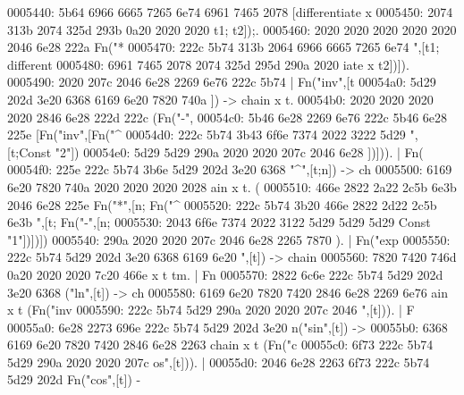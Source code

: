 \begin{bo
00010e0: 7865 647d 5c62 6567 696e 7b76 6572 6261  xed}
\begin{verba
00010f0: 7469 6d7d 0a20 2023 7479 7065 2074 6572  tim}
\begin{
0001c40: 7665 7262 6174 696d 7d0a 2020 236c 6574  verbatim}
\begin{boxe
00027a0: 647d 5c62 6567 696e 7b76 6572 6261 7469  d}
\begin{verbati
00027b0: 6d7d 0a20 2023 6c65 7420 696e 6669 7865  m}
\begin{v
0002c60: 6572 6261 7469 6d7d 0a20 2023 6c65 7420  erbatim}
\begin{
0002dc0: 7665 7262 6174 696d 7d0a 2020 236c 6574  verbatim}
\begin{boxed
0002f30: 7d5c 6265 6769 6e7b 7665 7262 6174 696d  }
\begin{verbatim
0002f40: 7d0a 2020 236c 6574 2068 6428 683a 3a74  }
\begin{v
0003e60: 6572 6261 7469 6d7d 0a20 2023 236f 7065  erbatim}
\begin{boxed
00042b0: 7d5c 6265 6769 6e7b 7665 7262 6174 696d  }
\begin{verbatim
00042c0: 7d0a 2020 2328 782c 7429 3b3b 0a20 202d  }
\begin{boxed}
\begin{boxed}
0005440: 5b64 6966 6665 7265 6e74 6961 7465 2078  [differentiate x
0005450: 2074 313b 2074 325d 293b 0a20 2020 2020   t1; t2]);.     
0005460: 2020 2020 2020 2020 2020 2046 6e28 222a             Fn("*
0005470: 222c 5b74 313b 2064 6966 6665 7265 6e74  ",[t1; different
0005480: 6961 7465 2078 2074 325d 295d 290a 2020  iate x t2])]).  
0005490: 2020 207c 2046 6e28 2269 6e76 222c 5b74     | Fn("inv",[t
00054a0: 5d29 202d 3e20 6368 6169 6e20 7820 740a  ]) -> chain x t.
00054b0: 2020 2020 2020 2020 2846 6e28 222d 222c          (Fn("-",
00054c0: 5b46 6e28 2269 6e76 222c 5b46 6e28 225e  [Fn("inv",[Fn("^
00054d0: 222c 5b74 3b43 6f6e 7374 2022 3222 5d29  ",[t;Const "2"])
00054e0: 5d29 5d29 290a 2020 2020 207c 2046 6e28  ])])).     | Fn(
00054f0: 225e 222c 5b74 3b6e 5d29 202d 3e20 6368  "^",[t;n]) -> ch
0005500: 6169 6e20 7820 740a 2020 2020 2020 2028  ain x t.       (
0005510: 466e 2822 2a22 2c5b 6e3b 2046 6e28 225e  Fn("*",[n; Fn("^
0005520: 222c 5b74 3b20 466e 2822 2d22 2c5b 6e3b  ",[t; Fn("-",[n;
0005530: 2043 6f6e 7374 2022 3122 5d29 5d29 5d29   Const "1"])])])
0005540: 290a 2020 2020 207c 2046 6e28 2265 7870  ).     | Fn("exp
0005550: 222c 5b74 5d29 202d 3e20 6368 6169 6e20  ",[t]) -> chain 
0005560: 7820 7420 746d 0a20 2020 2020 7c20 466e  x t tm.     | Fn
0005570: 2822 6c6e 222c 5b74 5d29 202d 3e20 6368  ("ln",[t]) -> ch
0005580: 6169 6e20 7820 7420 2846 6e28 2269 6e76  ain x t (Fn("inv
0005590: 222c 5b74 5d29 290a 2020 2020 207c 2046  ",[t])).     | F
00055a0: 6e28 2273 696e 222c 5b74 5d29 202d 3e20  n("sin",[t]) -> 
00055b0: 6368 6169 6e20 7820 7420 2846 6e28 2263  chain x t (Fn("c
00055c0: 6f73 222c 5b74 5d29 290a 2020 2020 207c  os",[t])).     |
00055d0: 2046 6e28 2263 6f73 222c 5b74 5d29 202d   Fn("cos",[t]) -

\end{boxed}
\end{boxed}
\end{verbatim
00042c0: 7d0a 2020 2328 782c 7429 3b3b 0a20 202d  }
\end{boxed
00042b0: 7d5c 6265 6769 6e7b 7665 7262 6174 696d  }
\end{v
0003e60: 6572 6261 7469 6d7d 0a20 2023 236f 7065  erbatim}
\end{verbatim
0002f40: 7d0a 2020 236c 6574 2068 6428 683a 3a74  }
\end{boxed
0002f30: 7d5c 6265 6769 6e7b 7665 7262 6174 696d  }
\end{
0002dc0: 7665 7262 6174 696d 7d0a 2020 236c 6574  verbatim}
\end{v
0002c60: 6572 6261 7469 6d7d 0a20 2023 6c65 7420  erbatim}
\end{verbati
00027b0: 6d7d 0a20 2023 6c65 7420 696e 6669 7865  m}
\end{boxe
00027a0: 647d 5c62 6567 696e 7b76 6572 6261 7469  d}
\end{
0001c40: 7665 7262 6174 696d 7d0a 2020 236c 6574  verbatim}
\end{verba
00010f0: 7469 6d7d 0a20 2023 7479 7065 2074 6572  tim}
\end{bo
00010e0: 7865 647d 5c62 6567 696e 7b76 6572 6261  xed}
